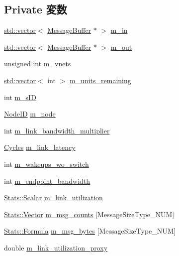 \subsection*{Private 変数}
\begin{DoxyCompactItemize}
\item 
\hyperlink{classstd_1_1vector}{std::vector}$<$ \hyperlink{classMessageBuffer}{MessageBuffer} $\ast$ $>$ \hyperlink{classThrottle_a100b02eb4313785163155af93186080d}{m\_\-in}
\item 
\hyperlink{classstd_1_1vector}{std::vector}$<$ \hyperlink{classMessageBuffer}{MessageBuffer} $\ast$ $>$ \hyperlink{classThrottle_ad9e47f9793f1407a8c461ddb24a07661}{m\_\-out}
\item 
unsigned int \hyperlink{classThrottle_a962ed040549be2a233a2f569096ab250}{m\_\-vnets}
\item 
\hyperlink{classstd_1_1vector}{std::vector}$<$ int $>$ \hyperlink{classThrottle_a6da48bb78ddc21093a1239150cb888cc}{m\_\-units\_\-remaining}
\item 
int \hyperlink{classThrottle_a14790c15903383889c1a9f8dc7b4d0d7}{m\_\-sID}
\item 
\hyperlink{TypeDefines_8hh_a83c14b4ae37e80071f6b3506a6c46151}{NodeID} \hyperlink{classThrottle_aa3fce887329cae44c3515a9694604843}{m\_\-node}
\item 
int \hyperlink{classThrottle_a2423f34721dfd17de46c46a816b5800a}{m\_\-link\_\-bandwidth\_\-multiplier}
\item 
\hyperlink{classCycles}{Cycles} \hyperlink{classThrottle_a875031a5ab7b5a17b22aae79d8c6764a}{m\_\-link\_\-latency}
\item 
int \hyperlink{classThrottle_aae3ca2ac27d25e29fa0b1856a862d658}{m\_\-wakeups\_\-wo\_\-switch}
\item 
int \hyperlink{classThrottle_a87d1115e90c126f4a0727873d2e9d72d}{m\_\-endpoint\_\-bandwidth}
\item 
\hyperlink{classStats_1_1Scalar}{Stats::Scalar} \hyperlink{classThrottle_a06c47065234ed05ffbee8ef57d5c5113}{m\_\-link\_\-utilization}
\item 
\hyperlink{classStats_1_1Vector}{Stats::Vector} \hyperlink{classThrottle_a74053f70c408cb41c07943d39f40b921}{m\_\-msg\_\-counts} \mbox{[}MessageSizeType\_\-NUM\mbox{]}
\item 
\hyperlink{classStats_1_1Formula}{Stats::Formula} \hyperlink{classThrottle_a88ad01e3ba9f7c20e95be6554a9badd6}{m\_\-msg\_\-bytes} \mbox{[}MessageSizeType\_\-NUM\mbox{]}
\item 
double \hyperlink{classThrottle_abe16a05102fe1f146eef5bbe449a3199}{m\_\-link\_\-utilization\_\-proxy}
\end{DoxyCompactItemize}


